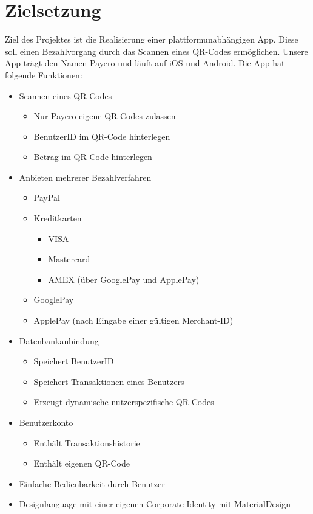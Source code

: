 
\chapter{Zielsetzung}

Ziel des Projektes ist die Realisierung einer plattformunabhängigen App.
Diese soll einen Bezahlvorgang durch das Scannen eines QR-Codes ermöglichen.
Unsere App trägt den Namen \glqq Payero\grqq{} und läuft auf iOS und Android.
Die App hat folgende Funktionen:

\begin{itemize}
    \item Scannen eines QR-Codes
    \begin{itemize}
        \item Nur Payero eigene QR-Codes zulassen
        \item BenutzerID im QR-Code hinterlegen
        \item Betrag im QR-Code hinterlegen
    \end{itemize}
    \item Anbieten mehrerer Bezahlverfahren
    \begin{itemize}
        \item PayPal
        \item Kreditkarten
        \begin{itemize}
            \item VISA
            \item Mastercard
            \item AMEX (über GooglePay und ApplePay)
        \end{itemize}
        \item GooglePay
        \item ApplePay (nach Eingabe einer gültigen Merchant-ID)
    \end{itemize}
    \item Datenbankanbindung
    \begin{itemize}
        \item Speichert BenutzerID
        \item Speichert Transaktionen eines Benutzers
        \item Erzeugt dynamische nutzerspezifische QR-Codes
    \end{itemize}
    \item Benutzerkonto
    \begin{itemize}
        \item Enthält Transaktionshistorie
        \item Enthält eigenen QR-Code
    \end{itemize}
    \item Einfache Bedienbarkeit durch Benutzer
    \item Designlanguage mit einer eigenen Corporate Identity mit MaterialDesign
\end{itemize}